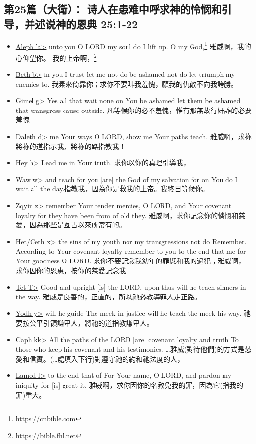 \subsection{第25篇（大衛）： 诗人在患难中呼求神的怜悯和引导，并述说神的恩典 25:1-22}
\begin{itemize}
\itemsep-.45em  
\item \underline{Aleph \<'a>} unto you O LORD my soul do I lift up. O my God,\footnote{https://cnbible.com} 雅威啊，我的心仰望你。 我的上帝啊，\footnote{https://bible.fhl.net}
\item \underline{Beth \<b>} in you I trust let me not do be ashamed not do let triumph my enemies to. 我素來倚靠你；求你不要叫我羞愧，願我的仇敵不向我誇勝。
\item \underline{Gimel \<g>} Yes all that wait none on You be ashamed let them be ashamed that transgress cause outside. 凡等候你的必不羞愧，惟有那無故行奸詐的必要羞愧
\item \underline{Daleth \<d>} me Your ways O LORD, show me Your paths teach. 雅威啊，求祢將祢的道指示我，將祢的路指教我！
\item \underline{Hey \<h>} Lead me in Your truth. 求你以你的真理引導我，
\item \underline{Waw \<w>} and teach for you [are] the God of my salvation for on You do I wait all the day.指教我，因為你是救我的上帝。我終日等候你。
\item \underline{Zqyin  \<z>} remember Your tender mercies, O LORD, and Your covenant loyalty for they have been from of old they. 雅威啊，求你記念你的憐憫和慈愛，因為那些是亙古以來所常有的。
\item \underline{Het/Ceth  \<x>} the sins of my youth nor my transgressions not do Remember. According to Your covenant loyalty remember to you to the end that me for Your goodness O LORD. 求你不要記念我幼年的罪愆和我的過犯；雅威啊，求你因你的恩惠，按你的慈愛記念我
\item \underline{Tet  \<T>} Good and upright [is] the LORD, upon thus will he teach sinners in the way. 雅威是良善的，正直的，所以祂必教導罪人走正路。
\item \underline{Yodh \<y>} will he guide The meek in justice will he teach the meek his way. 祂要按公平引領謙卑人，將祂的道指教謙卑人。
\item \underline{Caph \<kk>} All the paths of the LORD [are] covenant loyalty and truth To those who keep his covenant and his testimonies. …雅威(對待他們)的方式是慈愛和信實。(…處填入下行)對遵守祂的約和祂法度的人，
\item \underline{Lamed \<l>} to the end that of For Your name, O LORD, and pardon my iniquity for [is] great it. 雅威啊，求你因你的名赦免我的罪，因為它(指我的罪)重大。

\end{itemize}

